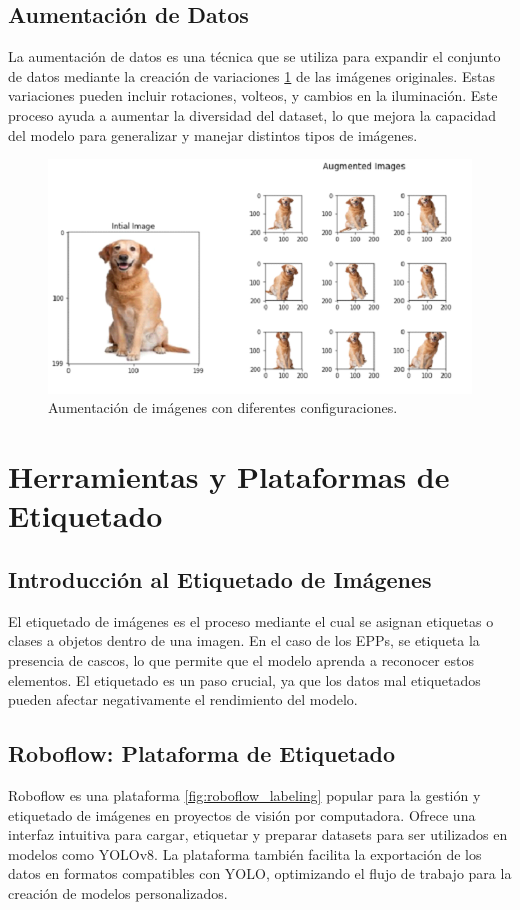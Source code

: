 \subsection{Aumentación de Datos}

La aumentación de datos es una técnica que se utiliza para expandir el conjunto de datos mediante la creación de variaciones \ref{fig:data_augmentation} de las imágenes originales. Estas variaciones pueden incluir rotaciones, volteos, y cambios en la iluminación. Este proceso ayuda a aumentar la diversidad del dataset, lo que mejora la capacidad del modelo para generalizar y manejar distintos tipos de imágenes.

\begin{figure}[!ht]
  \centering
  \includegraphics[width=.49\linewidth]{images/data_augmentation.png}
  \caption{Aumentación de imágenes con diferentes configuraciones.}
  \label{fig:data_augmentation}
\end{figure}

\section{Herramientas y Plataformas de Etiquetado}

\subsection{Introducción al Etiquetado de Imágenes}

El etiquetado de imágenes es el proceso mediante el cual se asignan etiquetas o clases a objetos dentro de una imagen. En el caso de los EPPs, se etiqueta la presencia de cascos, lo que permite que el modelo aprenda a reconocer estos elementos. El etiquetado es un paso crucial, ya que los datos mal etiquetados pueden afectar negativamente el rendimiento del modelo.

\subsection{Roboflow: Plataforma de Etiquetado}

Roboflow es una plataforma  \ref{fig:roboflow_labeling} popular para la gestión y etiquetado de imágenes en proyectos de visión por computadora. Ofrece una interfaz intuitiva para cargar, etiquetar y preparar datasets para ser utilizados en modelos como YOLOv8. La plataforma también facilita la exportación de los datos en formatos compatibles con YOLO, optimizando el flujo de trabajo para la creación de modelos personalizados.

